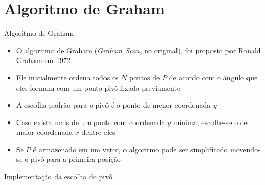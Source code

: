 \section{Algoritmo de Graham}

\begin{frame}[fragile]{Algoritmo de Graham}

    \begin{itemize}
        \item O algoritmo de Graham (\textit{Graham Scan}, no original), foi proposto por
            Ronald Graham em 1972
        \pause

        \item Ele inicialmente ordena todos os $N$ pontos de $P$ de acordo com o ângulo que eles 
            formam com um ponto pivô fixado previamente
        \pause

        \item A escolha padrão para o pivô é o ponto de menor coordenada $y$ 
        \pause

        \item Caso exista mais de um ponto com coordenada $y$ mínima, escolhe-se o de maior 
            coordenada $x$ dentre eles
        \pause

        \item Se $P$ é armazenado em um vetor, o algoritmo pode ser simplificado movendo-se o pivô 
            para a primeira posição
    \end{itemize}
\end{frame}

\begin{frame}[fragile]{Implementação da escolha do pivô}
\end{frame}

